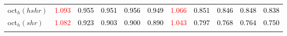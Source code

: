 \begin{tabular}[t]{l|>{}cccc>{}c|ccccc}
oct$_h(hshr)$ & \textcolor{red}{1.093} & \textcolor{black}{0.955} & \textcolor{black}{0.951} & \textcolor{black}{0.956} & \textcolor{black}{0.949} & \textcolor{red}{1.066} & \textcolor{black}{0.851} & \textcolor{black}{0.846} & \textcolor{black}{0.848} & \textcolor{black}{0.838}\\
oct$_h(shr)$ & \textcolor{red}{1.082} & \textcolor{black}{0.923} & \textcolor{black}{0.903} & \textcolor{black}{0.900} & \textcolor{black}{0.890} & \textcolor{red}{1.043} & \textcolor{black}{0.797} & \textcolor{black}{0.768} & \textcolor{black}{0.764} & \textcolor{black}{0.750}\\
\bottomrule
{}\\
\end{tabular}
